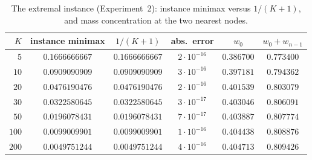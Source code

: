 \documentclass[11pt]{article}
\theoremstyle{definition}
\theoremstyle{remark}
\begin{document}
\begin{table}[htbp]
\centering\small
\caption{The extremal instance (Experiment~2): instance minimax versus
$1/(K+1)$, and mass concentration at the two nearest nodes.}
\label{tab:extremal}
\begin{tabular}{rccccc}
\toprule
$K$ & instance minimax & $1/(K+1)$ & abs.\ error & $w_0$ & $w_0+w_{n-1}$\\
\midrule
$5$   & $0.1666666667$ & $0.1666666667$ & $2\cdot10^{-16}$ & $0.386700$ & $0.773400$\\
$10$  & $0.0909090909$ & $0.0909090909$ & $3\cdot10^{-16}$ & $0.397181$ & $0.794362$\\
$20$  & $0.0476190476$ & $0.0476190476$ & $2\cdot10^{-16}$ & $0.401539$ & $0.803079$\\
$30$  & $0.0322580645$ & $0.0322580645$ & $3\cdot10^{-17}$ & $0.403046$ & $0.806091$\\
$50$  & $0.0196078431$ & $0.0196078431$ & $7\cdot10^{-17}$ & $0.403887$ & $0.807774$\\
$100$ & $0.0099009901$ & $0.0099009901$ & $1\cdot10^{-16}$ & $0.404438$ & $0.808876$\\
$200$ & $0.0049751244$ & $0.0049751244$ & $4\cdot10^{-16}$ & $0.404713$ & $0.809426$\\
\bottomrule
\end{tabular}
\end{table}
\end{document}

